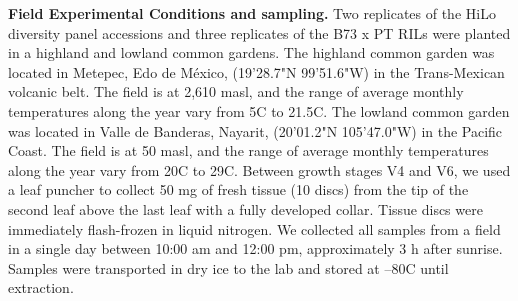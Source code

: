 \documentclass[9pt,twocolumn,twoside,lineno]{biorxiv}
\begin{document}
\textbf{Field Experimental Conditions and sampling.} 
Two replicates of the HiLo diversity panel accessions and three replicates of the B73 x PT RILs were planted in a highland and lowland common gardens. 
The highland common garden was located in Metepec, Edo de México, (19'28.7"N 99'51.6"W) in the Trans-Mexican volcanic belt. 
The field is at 2,610 masl, and the range of average monthly temperatures along the year vary from 5\degree C to 21.5\degree C.  
The lowland common garden was located in Valle de Banderas, Nayarit, (20'01.2"N 105'47.0"W) in the Pacific Coast. 
The field is at 50 masl, and the range of average monthly temperatures along the year vary from 20\degree C to 29\degree C.
Between growth stages V4 and V6, we used a leaf puncher to collect 50 mg of fresh tissue (10 discs) from the tip of the second leaf above the last leaf with a fully developed collar. 
Tissue discs were immediately flash-frozen in liquid nitrogen. 
We collected all samples from a field in a single day between 10:00 am and 12:00 pm, approximately 3 h after sunrise.
Samples were transported in dry ice to the lab and stored at --80\degree C until extraction. 
\end{document}
